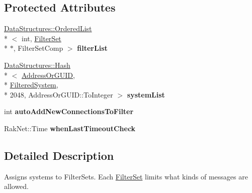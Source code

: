 \subsection*{Protected Attributes}
\begin{DoxyCompactItemize}
\item 
\hypertarget{class_rak_net_1_1_message_filter_a6f704ba334635b18cfc8dd35926ef453}{\hyperlink{class_data_structures_1_1_ordered_list}{Data\-Structures\-::\-Ordered\-List}\\*
$<$ int, \hyperlink{struct_rak_net_1_1_filter_set}{Filter\-Set} \\*
$\ast$, Filter\-Set\-Comp $>$ {\bfseries filter\-List}}\label{class_rak_net_1_1_message_filter_a6f704ba334635b18cfc8dd35926ef453}

\item 
\hypertarget{class_rak_net_1_1_message_filter_aacd02849eb8ebedf98fe9a8aea972602}{\hyperlink{class_data_structures_1_1_hash}{Data\-Structures\-::\-Hash}\\*
$<$ \hyperlink{struct_rak_net_1_1_address_or_g_u_i_d}{Address\-Or\-G\-U\-I\-D}, \\*
\hyperlink{struct_rak_net_1_1_filtered_system}{Filtered\-System}, \\*
2048, Address\-Or\-G\-U\-I\-D\-::\-To\-Integer $>$ {\bfseries system\-List}}\label{class_rak_net_1_1_message_filter_aacd02849eb8ebedf98fe9a8aea972602}

\item 
\hypertarget{class_rak_net_1_1_message_filter_a88f51085675a0576870fd5561fd381d1}{int {\bfseries auto\-Add\-New\-Connections\-To\-Filter}}\label{class_rak_net_1_1_message_filter_a88f51085675a0576870fd5561fd381d1}

\item 
\hypertarget{class_rak_net_1_1_message_filter_a11190439ba26cafa4baf928e5234bb2f}{Rak\-Net\-::\-Time {\bfseries when\-Last\-Timeout\-Check}}\label{class_rak_net_1_1_message_filter_a11190439ba26cafa4baf928e5234bb2f}

\end{DoxyCompactItemize}


\subsection{Detailed Description}
Assigns systems to Filter\-Sets. Each \hyperlink{struct_rak_net_1_1_filter_set}{Filter\-Set} limits what kinds of messages are allowed. 

